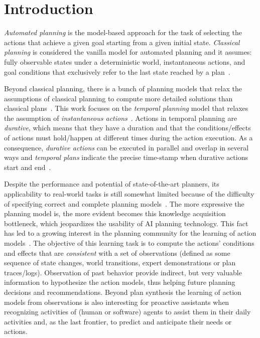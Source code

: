 \documentclass[runningheads]{llncs}
\begin{document}
\section{Introduction}
\label{sec:introduction}

{\em Automated planning} is the model-based approach for the task of selecting the actions that achieve a given goal starting from a given initial state. {\em Classical planning} is considered the vanilla model for automated planning and it assumes: fully observable states under a deterministic world, instantaneous actions, and goal conditions that exclusively refer to the last state reached by a plan~\cite{geffner2013concise,ghallab2004automated}.

Beyond classical planning, there is a bunch of planning models that relax the assumptions of classical planning to compute more detailed solutions than classical plans~\cite{ghallab2004automated}. This work focuses on the {\em temporal planning} model that relaxes the assumption of {\em instantaneous actions}~\cite{fox2003pddl2}. Actions in temporal planning are {\em durative}, which means that they have a duration and that the conditions/effects of actions must hold/happen at different times during the action execution. As a consequence, {\em durative actions} can be executed in parallel and overlap in several ways and {\em temporal plans} indicate the precise time-stamp when durative actions start and end~\cite{howey2004val,cushing2007temporal}.

Despite the performance and potential of state-of-the-art planners, its applicability to real-world tasks is still somewhat limited because of the difficulty of specifying correct and complete planning models~\cite{kambhampati2007model}. The more expressive the planning model is, the more evident becomes this knowledge acquisition bottleneck, which jeopardizes the usability of AI planning technology. This fact has led to a growing interest in the planning community for the learning of action models~\cite{jimenez2012review,arora2018review}. The objective of this learning task is to compute the actions' conditions and effects that are {\em consistent} with a set of observations (defined as some sequence of state changes, world transitions, expert demonstrations or plan traces/logs). Observation of past behavior provide indirect, but very valuable information to hypothesize the action models, thus helping future planning decisions and recommendations. Beyond plan synthesis the learning of action models from observations is also interesting for proactive assistants when recognizing activities of (human or software) agents to assist them in their daily activities and, as the last frontier, to predict and anticipate their needs or actions.
\end{document}
